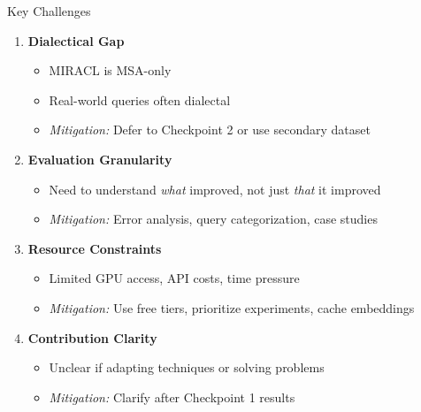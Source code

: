 \documentclass[aspectratio=169]{beamer}
\begin{document}
\begin{frame}{Key Challenges}
\begin{enumerate}
    \item \textbf{Dialectical Gap}
    \begin{itemize}
        \item MIRACL is MSA-only
        \item Real-world queries often dialectal
        \item \textit{Mitigation:} Defer to Checkpoint 2 or use secondary dataset
    \end{itemize}
    
    \item \textbf{Evaluation Granularity}
    \begin{itemize}
        \item Need to understand \textit{what} improved, not just \textit{that} it improved
        \item \textit{Mitigation:} Error analysis, query categorization, case studies
    \end{itemize}
    
    \item \textbf{Resource Constraints}
    \begin{itemize}
        \item Limited GPU access, API costs, time pressure
        \item \textit{Mitigation:} Use free tiers, prioritize experiments, cache embeddings
    \end{itemize}
    
    \item \textbf{Contribution Clarity}
    \begin{itemize}
        \item Unclear if adapting techniques or solving problems
        \item \textit{Mitigation:} Clarify after Checkpoint 1 results
    \end{itemize}
\end{enumerate}
\end{frame}
\end{document}
